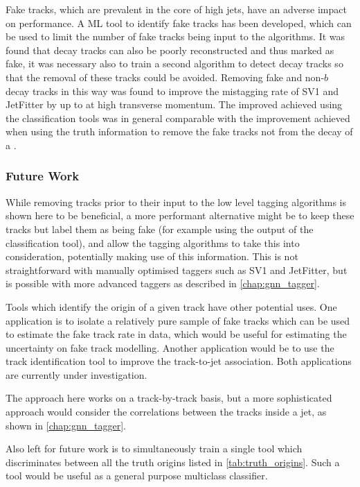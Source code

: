 Fake tracks, which are prevalent in the core of high \pt jets, have an adverse impact on \btagging performance.
A ML tool to identify fake tracks has been developed, which can be used to limit the number of fake tracks being input to the \btagging algorithms.
It was found that \bhadron decay tracks can also be poorly reconstructed and thus marked as fake, it was necessary also to train a second algorithm to detect \bhadron decay tracks so that the removal of these tracks could be avoided.
Removing fake and non-$b$ decay tracks in this way was found to improve the \ljet mistagging rate of SV1 and JetFitter by up to  at high transverse momentum.
The improved achieved using the classification tools was in general comparable with the improvement achieved when using the truth information to remove the fake tracks not from the decay of a \bhadron.

\subsubsection{Future Work}
While removing tracks prior to their input to the low level tagging algorithms is shown here to be beneficial, a more performant alternative might be to keep these tracks but label them as being fake (for example using the output of the classification tool), and allow the tagging algorithms to take this into consideration, potentially making use of this information.
This is not straightforward with manually optimised taggers such as SV1 and JetFitter, but is possible with more advanced taggers as described in \cref{chap:gnn_tagger}.

Tools which identify the origin of a given track have other potential uses.
One application is to isolate a relatively pure sample of fake tracks which can be used to estimate the fake track rate in data, which would be useful for estimating the uncertainty on fake track modelling.
Another application would be to use the \bhadron track identification tool to improve the track-to-jet association.
Both applications are currently under investigation.

The approach here works on a track-by-track basis, but a more sophisticated approach would consider the correlations between the tracks inside a jet, as shown in \cref{chap:gnn_tagger}.

Also left for future work is to simultaneously train a single tool which discriminates between all the truth origins listed in \cref{tab:truth_origins}.
Such a tool would be useful as a general purpose multiclass classifier.